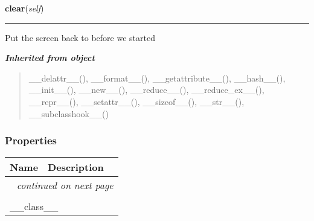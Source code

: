     \label{pygame-asteroids:virtual_keyboard:VirtualKeyboard:clear}

    \vspace{0.5ex}

\hspace{.8\funcindent}\begin{boxedminipage}{\funcwidth}

    \raggedright \textbf{clear}(\textit{self})

    \vspace{-1.5ex}

    \rule{\textwidth}{0.5\fboxrule}
\setlength{\parskip}{2ex}
    Put the screen back to before we started

\setlength{\parskip}{1ex}
    \end{boxedminipage}


\large{\textbf{\textit{Inherited from object}}}

\begin{quote}
\_\_delattr\_\_(), \_\_format\_\_(), \_\_getattribute\_\_(), \_\_hash\_\_(), \_\_init\_\_(), \_\_new\_\_(), \_\_reduce\_\_(), \_\_reduce\_ex\_\_(), \_\_repr\_\_(), \_\_setattr\_\_(), \_\_sizeof\_\_(), \_\_str\_\_(), \_\_subclasshook\_\_()
\end{quote}


  \subsubsection{Properties}

    \vspace{-1cm}
\hspace{\varindent}\begin{longtable}{|p{\varnamewidth}|p{\vardescrwidth}|l}
\cline{1-2}
\cline{1-2} \centering \textbf{Name} & \centering \textbf{Description}& \\
\cline{1-2}
\endhead\cline{1-2}\multicolumn{3}{r}{\small\textit{continued on next page}}\\\endfoot\cline{1-2}
\endlastfoot\multicolumn{2}{|l|}{\textit{Inherited from object}}\\
\multicolumn{2}{|p{\varwidth}|}{\raggedright \_\_class\_\_}\\
\cline{1-2}
\end{longtable}

